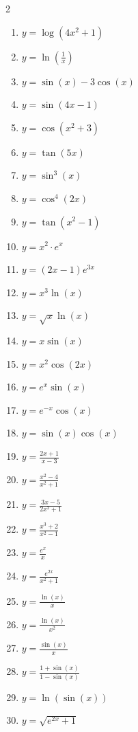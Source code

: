 \documentclass[11pt,a4paper]{article}
\begin{document}
\newpage

\begin{multicols}{2}
\begin{enumerate}[label=\textbf{\arabic*.}, leftmargin=2em, itemsep=10pt, start=31]
    \item $y = \log(4x^2 + 1)$
    \item $y = \ln\left(\frac{1}{x}\right)$
    \item $y = \sin(x) - 3\cos(x)$
    \item $y = \sin(4x - 1)$
    \item $y = \cos(x^2 + 3)$
    \item $y = \tan(5x)$
    \item $y = \sin^3(x)$
    \item $y = \cos^4(2x)$
    \item $y = \tan(x^2 - 1)$
    \item $y = x^2 \cdot e^x$
    \item $y = (2x - 1)e^{3x}$
    \item $y = x^3 \ln(x)$
    \item $y = \sqrt{x}\ln(x)$
    \item $y = x \sin(x)$
    \item $y = x^2 \cos(2x)$
    \item $y = e^x \sin(x)$
    \item $y = e^{-x}\cos(x)$
    \item $y = \sin(x)\cos(x)$
    \item $y = \frac{2x + 1}{x - 3}$
    \item $y = \frac{x^2 - 4}{x^2 + 1}$
    \item $y = \frac{3x - 5}{2x^2 + 1}$
    \item $y = \frac{x^3 + 2}{x^2 - 1}$
    \item $y = \frac{e^x}{x}$
    \item $y = \frac{e^{2x}}{x^2 + 1}$
    \item $y = \frac{\ln(x)}{x}$
    \item $y = \frac{\ln(x)}{x^2}$
    \item $y = \frac{\sin(x)}{x}$
    \item $y = \frac{1 + \sin(x)}{1 - \sin(x)}$
    \item $y = \ln(\sin(x))$
    \item $y = \sqrt{e^{2x} + 1}$
\end{enumerate}
\end{multicols}
\end{document}
